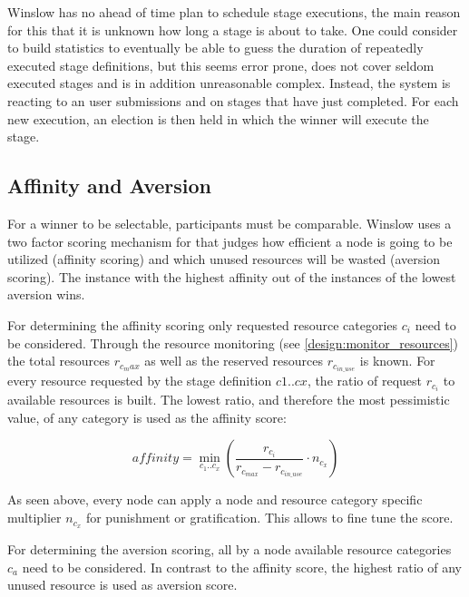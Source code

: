 Winslow has no ahead of time plan to schedule stage executions, the main reason for this that it is unknown how long a stage is about to take.
One could consider to build statistics to eventually be able to guess the duration of repeatedly executed stage definitions, but this seems error prone, does not cover seldom executed stages and is in addition unreasonable complex. 
Instead, the system is reacting to an user submissions and on stages that have just completed.
For each new execution, an election is then held in which the winner will execute the stage.

\subsection{Affinity and Aversion}
\label{election:affinity_and_aversion} 

For a winner to be selectable, participants must be comparable.
Winslow uses a two factor scoring mechanism for that judges how efficient a node is going to be utilized (affinity scoring) and which unused resources will be wasted (aversion scoring).
The instance with the highest affinity out of the instances of the lowest aversion wins.

For determining the affinity scoring only requested resource categories $c_i$ need to be considered.
Through the resource monitoring (see \autoref{design:monitor_resources}) the total resources $r_{c_max}$ as well as the reserved resources $r_{c_{in\_use}}$ is known.
For every resource requested by the stage definition $c1 .. cx$, the ratio of request $r_{c_i}$ to available resources is built.
The lowest ratio, and therefore the most pessimistic value, of any category is used as the affinity score:

\begin{equation}
	\label{election:eq:affinity}
	{affinity} = \min_{c_1 .. c_x} \left( \frac{r_{c_i}}{r_{c_{max}} - r_{c_{in\_use}}} \cdot n_{c_x} \right)
\end{equation}

As seen above, every node can apply a node and resource category specific multiplier $n_{c_x}$ for punishment or gratification.
This allows to fine tune the score.

For determining the aversion scoring, all by a node available resource categories $c_a$ need to be considered.
In contrast to the affinity score, the highest ratio of any unused resource is used as aversion score.

